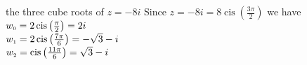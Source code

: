 { the three cube roots of $z = -8i$}
{ Since $z = -8i = 8\operatorname{cis}\left(\frac{3\pi}{2}\right)$ we have \\$w_{\text{\tiny$0$}} = 2\operatorname{cis}\left(\frac{\pi}{2}\right) = 2i$\\$w_{\text{\tiny$1$}} = 2\operatorname{cis}\left(\frac{7\pi}{6}\right) = -\sqrt{3} -i$\\$w_{\text{\tiny$2$}} = \operatorname{cis}\left(\frac{11\pi}{6}\right) = \sqrt{3}-i$}
